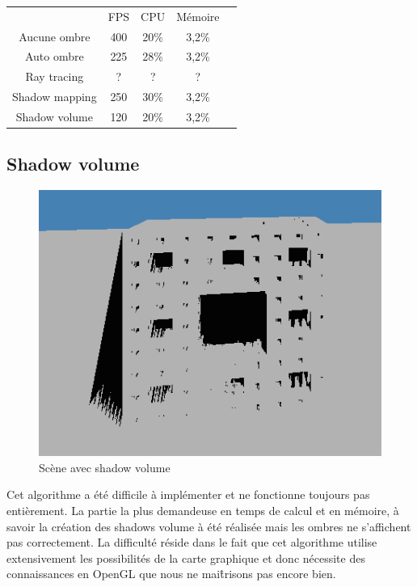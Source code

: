 \documentclass[a4paper,10pt]{report}
\begin{document}
\begin{table}[h]
\centering
\begin{tabular}{|c|c|c|c|l}
\cline{1-4}
 & FPS  & CPU & Mémoire  &  \\ \cline{1-4}
 Aucune ombre& 400 & 20\%  & 3,2\%  &  \\ \cline{1-4}
 Auto ombre& 225 & 28\%  & 3,2\%  &  \\ \cline{1-4}
 Ray tracing& ? & ?  & ?  &  \\ \cline{1-4}
 Shadow mapping& 250  & 30\%  & 3,2\%  &  \\ \cline{1-4}
 Shadow volume& 120  & 20\%  & 3,2\%  &  \\ \cline{1-4}
\end{tabular}
\end{table}

\subsection{Shadow volume}

\begin{figure}[H]
\includegraphics[scale=0.4]{images/shadowvolume.png}
\centering
\caption{Scène avec shadow volume}
\end{figure}

Cet algorithme a été difficile à implémenter et ne fonctionne toujours pas entièrement. La partie la plus demandeuse en temps de calcul et en mémoire, à savoir la création des shadows volume à été réalisée mais les ombres ne s'affichent pas correctement. La difficulté réside dans le fait que cet algorithme utilise extensivement les possibilités de la carte graphique et donc nécessite des connaissances en OpenGL que nous ne mai\^trisons pas encore bien.
\end{document}
